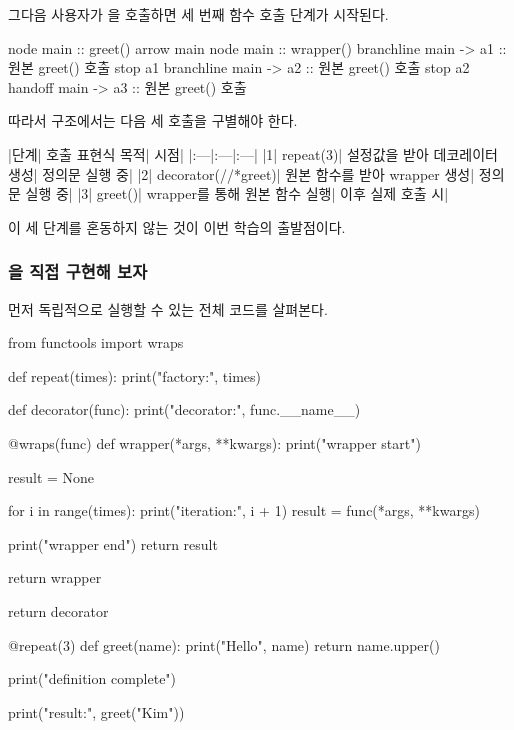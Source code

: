그다음 사용자가 을 호출하면 세 번째 함수 호출 단계가 시작된다.

\begin{dhkbranch}[in=8]
node main :: greet()
arrow main
node main :: wrapper()
branchline main -> a1 :: 원본 greet() 호출
stop a1
branchline main -> a2 :: 원본 greet() 호출
stop a2
handoff main -> a3 :: 원본 greet() 호출
\end{dhkbranch}

따라서  구조에서는 다음 세 호출을 구별해야 한다.

\begin{dhktable}
|단계|	호출 표현식	목적|	시점|
|:---|:---|:---|
|1|	repeat(3)|	설정값을 받아 데코레이터 생성|	정의문 실행 중|
|2|	decorator(//*greet)|	원본 함수를 받아 wrapper 생성|	정의문 실행 중|
|3|	greet()|	wrapper를 통해 원본 함수 실행|	이후 실제 호출 시|
\end{dhktable}

이 세 단계를 혼동하지 않는 것이 이번 학습의 출발점이다.

\subsubsection{을 직접 구현해 보자}

먼저 독립적으로 실행할 수 있는 전체 코드를 살펴본다.

\begin{dhkcode}
from functools import wraps

def repeat(times):
    print("factory:", times)

    def decorator(func):
        print("decorator:", func.__name__)

        @wraps(func)
        def wrapper(*args, **kwargs):
            print("wrapper start")

            result = None

            for i in range(times):
                print("iteration:", i + 1)
                result = func(*args, **kwargs)

            print("wrapper end")
            return result

        return wrapper

    return decorator


@repeat(3)
def greet(name):
    print("Hello", name)
    return name.upper()


print("definition complete")

print("result:", greet("Kim"))
\end{dhkcode}

